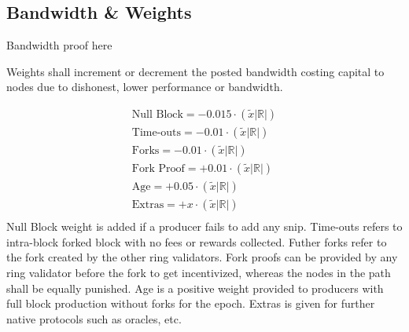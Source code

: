 \documentclass[../Bitcoin Blink.tex]{subfiles}
\begin{document}
\normalsize
\subsection{Bandwidth \& Weights}

Bandwidth proof here


Weights shall increment or decrement the posted bandwidth costing capital to nodes due to dishonest, lower performance or bandwidth.

\begin{align*}
\text{Null Block} = -0.015 \cdot (\widetilde{x}|\mathbb{R}|)\\
\text{Time-outs} = -0.01 \cdot (\widetilde{x}|\mathbb{R}|)\\
\text{Forks} = -0.01 \cdot (\widetilde{x}|\mathbb{R}|)\\
\text{Fork Proof} = +0.01 \cdot (\widetilde{x}|\mathbb{R}|)\\
\text{Age} = +0.05 \cdot (\widetilde{x}|\mathbb{R}|)\\
\text{Extras} = +x \cdot (\widetilde{x}|\mathbb{R}|)\\
\end{align*}
Null Block weight is added if a producer fails to add any snip. Time-outs refers to intra-block forked block with no fees or rewards collected. Futher forks refer to the fork created by the other ring validators. Fork proofs can be provided by any ring validator before the fork to get incentivized, whereas the nodes in the path shall be equally punished. Age is a positive weight provided to producers with full block production without forks for the epoch. Extras is given for further native protocols such as oracles, etc.
\end{document}
